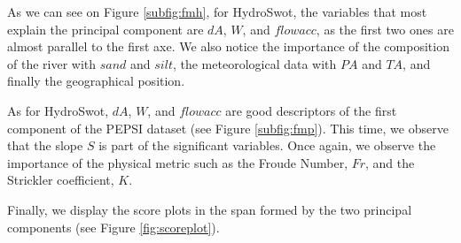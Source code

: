 As we can see on Figure \ref{subfig:fmh}, for HydroSwot, the variables that most explain the principal component are $dA$, $W$, and $flowacc$, as the first two ones are almost parallel to the first axe. We also notice the importance of the composition of the river with $sand$ and $silt$, the meteorological data with $PA$ and $TA$, and finally the geographical position. 

As for HydroSwot, $dA$, $W$, and $flowacc$ are good descriptors of the first component of the PEPSI dataset (see Figure \ref{subfig:fmp}). This time, we observe that the slope $S$ is part of the significant variables. Once again, we observe the importance of the physical metric such as the Froude Number, $Fr$, and the Strickler coefficient, $K$.\newline

Finally, we display the score plots in the span formed by the two principal components (see Figure \ref{fig:scoreplot}).

